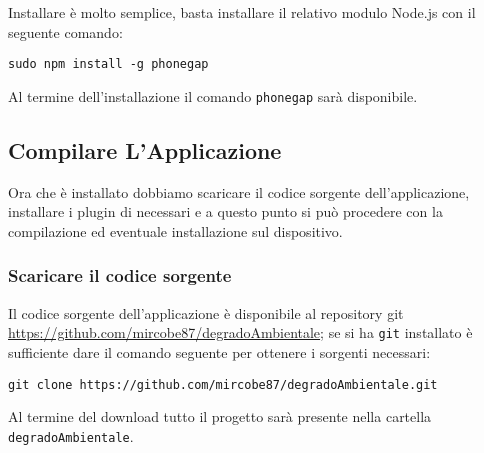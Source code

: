         Installare \pg{} è molto semplice, basta installare il relativo modulo 
        Node.js con il seguente comando:
        \begin{lstlisting}[language=plane]
 sudo npm install -g phonegap
        \end{lstlisting}
        Al termine dell'installazione il comando \texttt{phonegap} sarà 
        disponibile.
        
    \subsection{Compilare L'Applicazione}
        Ora che \pg{} è installato dobbiamo scaricare il codice sorgente 
        dell'applicazione, installare i plugin di \pg{} necessari e a questo 
        punto si può procedere con la compilazione ed eventuale installazione 
        sul dispositivo.
        
        \subsubsection{Scaricare il codice sorgente}
            Il codice sorgente dell'applicazione \pg{} è disponibile al 
            repository git 
            \url{https://github.com/mircobe87/degradoAmbientale}; se si ha 
            \texttt{git} installato è sufficiente dare il comando seguente per 
            ottenere i sorgenti necessari:
            \begin{lstlisting}[language=plane]
 git clone https://github.com/mircobe87/degradoAmbientale.git
            \end{lstlisting}
            Al termine del download tutto il progetto sarà presente nella 
            cartella\\ \texttt{degradoAmbientale}.
            
